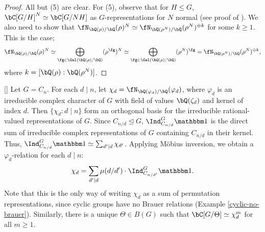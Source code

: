 \begin{proof}
    All but (5) are clear. For (5), observe that for $H \leq G$, $\bC[G / H]^N \simeq \bC[G / NH]$ as $G$-representations for $N$ normal (see proof of \cite[Theorem 2.8]{reg-const}). We also need to show that $\repnorm{\rho}^N \simeq \repnorm{\rho^N}^{\oplus k}$ for some $k \geq 1$. This is the case; 
    $$\repnorm{\rho}^N \simeq 
    \bigoplus_{\fg \in \Gal(\bQ(\rho) / \bQ)} (\rho^{\fg})^N \simeq \bigoplus_{\fg \in \Gal(\bQ(\rho) / \bQ)} (\rho^N)^{\fg} = \repnorm{\rho^N}^{\oplus k},$$
    where $k = [ \bQ(\rho) : \bQ(\rho^N)]$. 
\end{proof}


\begin{example}\label{cyclic-relns}[\cite[Exercise 13.1]{Serre}]
    Let $G = C_n$. For each $d \mid n$, let $\chi_d = \repnorm{\varphi_d}$, where $\varphi_d$ is an irreducible complex character of $G$ with field of values $\bQ(\zeta_d)$ and kernel of index $d$.
    Then $\{ \chi_d \colon d\mid n \}$ form an orthogonal basis for the irreducible rational-valued representations of $G$. Since $C_{n / d} \trianglelefteq G$, $\Ind_{C_{n/ d}}^G \trivial$ is the direct sum of irreducible complex representations of $G$ containing $C_{n / d}$ in their kernel. Thus, $\Ind_{C_{n/ d}}^G \trivial \simeq \sum_{d' \mid d} \chi_{d'}$. Applying M\"{o}bius inversion, we obtain a $\varphi_d$-relation for each $d \mid n$:
    \[ \chi_d = \sum_{d' \mid d} \mu(d / d') \cdot \Ind_{C_{n/ d'}}^G \trivial. \]
    Note that this is the only way of writing $\chi_d$ as a sum of permutation representations, since cyclic groups have no Brauer relations (Example \ref{cyclic-no-brauer}). Similarly, there is a unique $\Theta \in B(G)$ such that $\bC[G / \Theta] \simeq \chi_d^{m}$ for all $m \geq 1$.
    \end{example}

